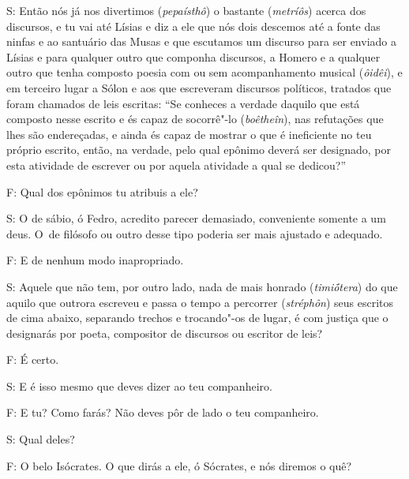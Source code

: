 S: Então nós já nos divertimos (\emph{pepaísthô}) o bastante
(\emph{metríôs}) acerca dos discursos, e tu vai até Lísias e diz a ele
que nós dois descemos até a fonte das ninfas e ao santuário das Musas e
que escutamos um discurso \bekker{[278c]} para ser enviado a Lísias e para
qualquer outro que componha discursos, a Homero e a qualquer outro que
tenha composto poesia com ou sem acompanhamento musical (\emph{ôidêi}),
e em terceiro lugar a Sólon e aos que escreveram discursos políticos,
tratados que foram chamados de leis escritas: ``Se conheces a verdade
daquilo que está composto nesse escrito e és capaz de socorrê"-lo
(\emph{boêtheîn}), nas refutações que lhes são endereçadas, e ainda és
capaz de mostrar o que é ineficiente no teu próprio escrito, então, na
verdade, pelo qual epônimo deverá ser designado, por esta atividade de
escrever ou por aquela atividade a qual se dedicou?''

 

F: Qual dos epônimos tu atribuis a ele?

 

S: O de sábio, ó Fedro, acredito parecer demasiado, conveniente somente
a um deus. O~de filósofo ou outro desse tipo poderia ser mais ajustado e
adequado.

 

F: E de nenhum modo inapropriado.

 

S: Aquele que não tem, por outro lado, nada de mais honrado
(\emph{timiṓtera}) do que aquilo que outrora escreveu e passa o tempo a
percorrer (\emph{stréphôn}) seus escritos de cima abaixo, separando
trechos e trocando"-os de lugar, \bekker{[278e]} é com justiça que o
designarás por poeta, compositor de discursos ou escritor de leis?

 

F: É certo.

 

S: E é isso mesmo que deves dizer ao teu companheiro.

 

F: E tu? Como farás? Não deves pôr de lado o teu companheiro.

 

S: Qual deles?

F: O belo Isócrates. O que dirás a ele, ó Sócrates, e nós diremos o quê?

